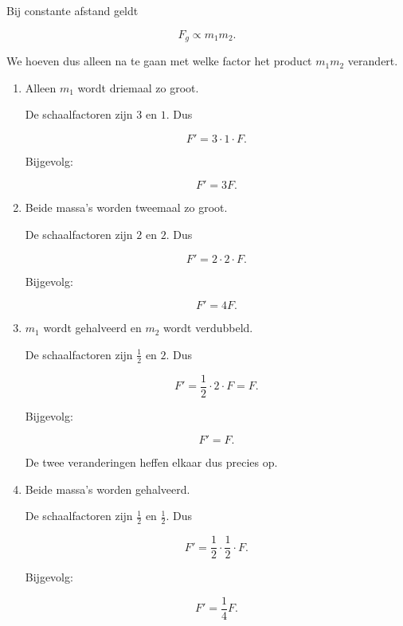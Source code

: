 \documentclass{ximera}
\begin{document}
\begin{oplossing}

Bij constante afstand geldt

\[
F_g\propto m_1m_2.
\]

We hoeven dus alleen na te gaan met welke factor het product
$m_1m_2$ verandert.

\begin{enumerate}

  \item Alleen $m_1$ wordt driemaal zo groot.

  De schaalfactoren zijn $3$ en $1$. Dus

  \[
  F'=3\cdot1\cdot F.
  \]

  Bijgevolg:

  \[
  \boxed{F'=3F.}
  \]

  \item Beide massa's worden tweemaal zo groot.

  De schaalfactoren zijn $2$ en $2$. Dus

  \[
  F'=2\cdot2\cdot F.
  \]

  Bijgevolg:

  \[
  \boxed{F'=4F.}
  \]

  \item $m_1$ wordt gehalveerd en $m_2$ wordt verdubbeld.

  De schaalfactoren zijn $\frac12$ en $2$. Dus

  \[
  F'
  =
  \frac12\cdot2\cdot F
  =
  F.
  \]

  Bijgevolg:

  \[
  \boxed{F'=F.}
  \]

  De twee veranderingen heffen elkaar dus precies op.

  \item Beide massa's worden gehalveerd.

  De schaalfactoren zijn $\frac12$ en $\frac12$. Dus

  \[
  F'
  =
  \frac12\cdot\frac12\cdot F.
  \]

  Bijgevolg:

  \[
  \boxed{
  F'=\frac14F.
  }
  \]

\end{enumerate}

\end{oplossing}


\end{document}
